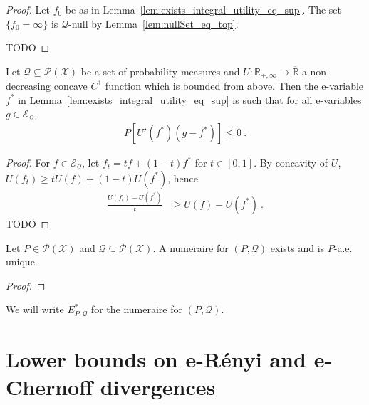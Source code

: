 \begin{proof}
Let $f_0$ be as in Lemma~\ref{lem:exists_integral_utility_eq_sup}.
The set $\{f_0 = \infty\}$ is $\mathcal{Q}$-null by Lemma~\ref{lem:nullSet_eq_top}.

TODO
\end{proof}


\begin{lemma}\label{lem:bounded_numeraire_first_order}
Let $\mathcal{Q} \subseteq \mathcal{P}(\mathcal{X})$ be a set of probability measures and $U : \mathbb{R}_{+,\infty} \to \overline{\mathbb{R}}$ a non-decreasing concave $C^1$ function which is bounded from above.
Then the e-variable $f^*$ in Lemma~\ref{lem:exists_integral_utility_eq_sup} is such that for all e-variables $g \in \mathcal{E}_{\mathcal{Q}}$,
\begin{align*}
  P\left[ U'(f^*) (g - f^*) \right] \le 0 \: .
\end{align*}
\end{lemma}

\begin{proof}
For $f \in \mathcal{E}_{\mathcal{Q}}$, let $f_t = t f + (1-t) f^*$ for $t \in [0,1]$.
By concavity of $U$, $U(f_t) \ge t U(f) + (1-t) U(f^*)$, hence
\begin{align*}
  \frac{U(f_t) - U(f^*)}{t}
  &\ge U(f) - U(f^*)
  \: .
\end{align*}
TODO
\end{proof}


\begin{theorem}\label{thm:exists_numeraire}
Let $P \in \mathcal{P}(\mathcal{X})$ and $\mathcal{Q} \subseteq \mathcal{P}(\mathcal{X})$.
A numeraire for $(P, \mathcal{Q})$ exists and is $P$-a.e. unique.
\end{theorem}

\begin{proof}

\end{proof}

We will write $E^*_{P, \mathcal{Q}}$ for the numeraire for $(P, \mathcal{Q})$.


\chapter{Lower bounds on e-Rényi and e-Chernoff divergences}


